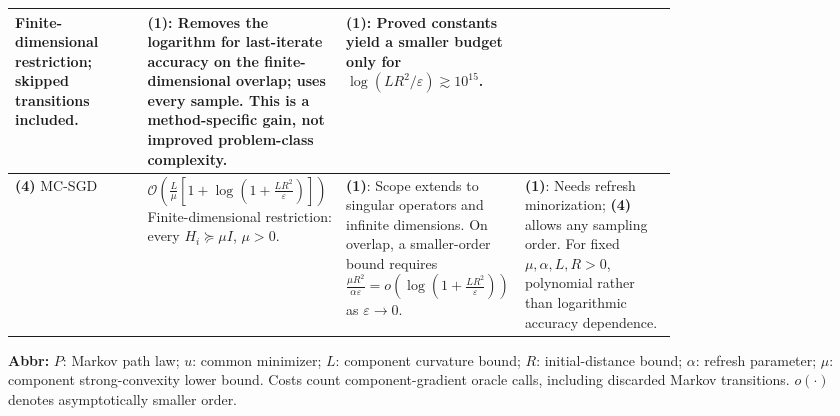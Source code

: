 \begin{table}[tp]
\begin{threeparttable}
\begin{tabularx}{\linewidth}{@{}>{\raggedright\arraybackslash}p{0.20\linewidth}>{\raggedright\arraybackslash}p{0.30\linewidth}>{\raggedright\arraybackslash}p{0.27\linewidth}>{\raggedright\arraybackslash}X@{}}
Finite-dimensional restriction; skipped transitions included.
& \textbf{(1)}: Removes the logarithm for last-iterate accuracy on the finite-dimensional overlap; uses every sample. This is a method-specific gain, not improved problem-class complexity.
& \textbf{(1)}: Proved constants yield a smaller budget only for $\log(LR^2/\varepsilon)\gtrsim10^{15}$. \\
\midrule
\textbf{(4)} MC-SGD \citep[Theorem~5.6]{mqEven2023}
& $\mathcal{O}\!\left(\frac{L}{\mu}\left[1+\log\!\left(1+\frac{LR^2}{\varepsilon}\right)\right]\right)$\newline
Finite-dimensional restriction: every $H_i\succeq\mu I$, $\mu>0$.
& \textbf{(1)}: Scope extends to singular operators and infinite dimensions. On overlap, a smaller-order bound requires $\frac{\mu R^2}{\alpha\varepsilon}=o\!\left(\log\!\left(1+\frac{LR^2}{\varepsilon}\right)\right)$ as $\varepsilon\to0$.
& \textbf{(1)}: Needs refresh minorization; \textbf{(4)} allows any sampling order. For fixed $\mu,\alpha,L,R>0$, polynomial rather than logarithmic accuracy dependence. \\
\bottomrule
\end{tabularx}
\begin{tablenotes}[flushleft]\footnotesize
\item[] \textbf{Abbr:} $P$: Markov path law; $u$: common minimizer; $L$: component curvature bound; $R$: initial-distance bound; $\alpha$: refresh parameter; $\mu$: component strong-convexity lower bound. Costs count component-gradient oracle calls, including discarded Markov transitions. $o(\cdot)$ denotes asymptotically smaller order.
\end{tablenotes}
\end{threeparttable}
\end{table}
\clearpage
